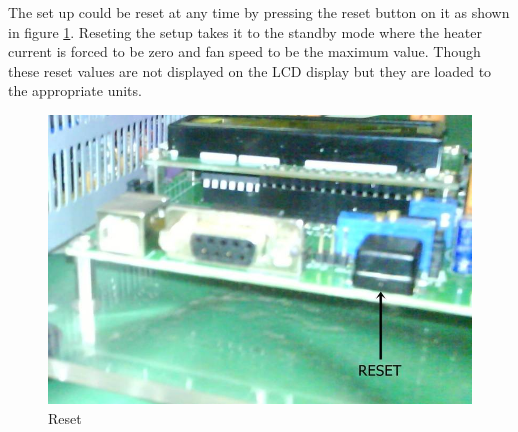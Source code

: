 \documentclass[12pt]{report}
\begin{document}
The set up could be reset at any time by pressing the reset button on it as shown in figure \ref{reset}. Reseting the setup takes it to the standby mode where the heater current is forced to be zero and fan speed to be the maximum value. Though these reset values are not displayed on the LCD display but they are loaded to the appropriate units. 
\begin{figure}
\centering
\includegraphics[width=0.5\linewidth]{r.jpg}
\caption{Reset}
\label{reset}
\end{figure}


%
%
%
%


%
%
%

%
%




\end{document}
